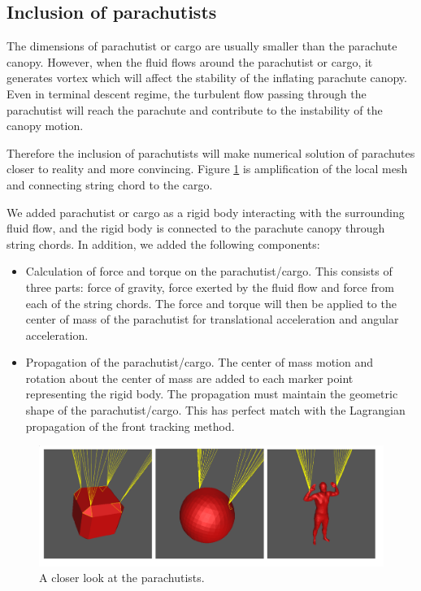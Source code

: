 \subsection{Inclusion of parachutists} 
The dimensions of parachutist or cargo are usually smaller than the parachute
canopy. However, when the fluid flows around the parachutist or cargo, it
generates vortex which will affect the stability of the inflating parachute
canopy.  Even in terminal descent regime, the turbulent flow passing through
the parachutist will reach the parachute and contribute to the instability of
the canopy motion.

Therefore the inclusion of parachutists will make numerical solution of
parachutes closer to reality and more convincing.  Figure \ref{fig:init_closer}
is amplification of the local mesh and connecting string chord to the cargo.

We added parachutist or cargo as a rigid body interacting with the surrounding
fluid flow, and the rigid body is connected to the parachute canopy through
string chords. In addition, we added the following components:

\begin{itemize}
\item Calculation of force and torque on the parachutist/cargo. This consists
of three parts: force of gravity, force exerted by the fluid flow and force
from each of the string chords. The force and torque will then be applied to
the center of mass of the parachutist for translational acceleration and
angular acceleration.

\item Propagation of the parachutist/cargo. The center
of mass motion and rotation about the center of mass are added to each marker
point representing the rigid body. The propagation must maintain the geometric
shape of the parachutist/cargo. This has perfect match with the Lagrangian
propagation of the front tracking method.
\end{itemize}

\begin{figure}[!ht] \centering
\includegraphics[width=6in]{Figures/parachutist-1.png} \caption{A closer look at
the parachutists.}\label{fig:init_closer} \end{figure}

